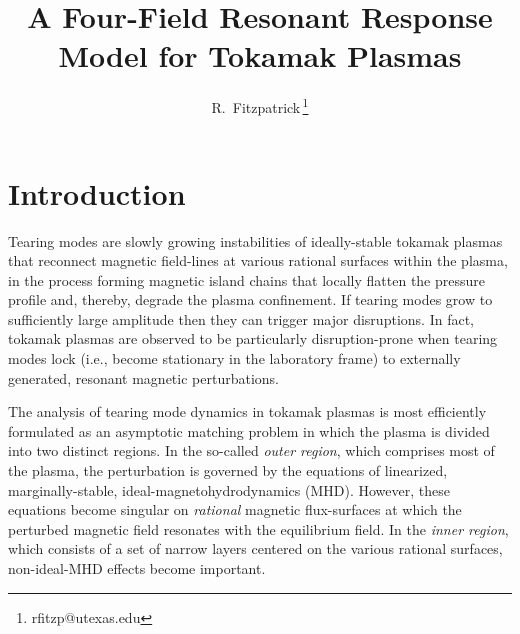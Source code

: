 \documentclass[12pt,prb,aps]{revtex4-1}
\begin{document}
\title{A Four-Field Resonant Response Model for Tokamak Plasmas}

\author{R.~Fitzpatrick\,\footnote{rfitzp@utexas.edu}}

\begin{abstract}

\end{abstract}

\maketitle

\section{Introduction}
Tearing modes are slowly growing instabilities of ideally-stable tokamak plasmas that reconnect magnetic field-lines
at various rational surfaces within the plasma, in the process forming magnetic island chains that locally flatten the pressure profile and, thereby, degrade the plasma confinement.\cite{wes}
If tearing modes grow to sufficiently large amplitude then they can trigger major disruptions.\cite{wes1}  In fact,  tokamak
plasmas are observed to be particularly disruption-prone when tearing modes lock (i.e., become stationary in the
laboratory frame) to externally generated, resonant magnetic perturbations.\cite{vries}  

The analysis  of tearing mode dynamics in tokamak plasmas is most efficiently formulated as an asymptotic matching problem in which the  plasma is  divided into two distinct regions.\cite{fkr}    In the so-called {\em outer region}, which comprises most
of the plasma, the perturbation is governed by the equations of linearized, marginally-stable, ideal-magnetohydrodynamics (MHD).
However, these equations become singular on   {\em rational}\/ magnetic flux-surfaces at which the perturbed magnetic field resonates with the equilibrium field. In the {\em inner region}, which
consists of a set of narrow layers centered on the various rational surfaces, non-ideal-MHD effects   become important.
\end{document}
